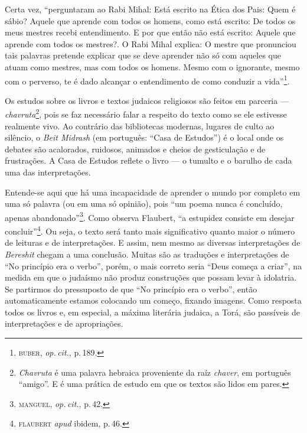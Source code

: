 \begin{center}\end{center}

\noindent{}Certa vez, ``perguntaram ao Rabi Mihal: Está escrito na Ética dos
Pais: Quem é sábio? Aquele que aprende com todos os homens, como está
escrito: De todos os meus mestres recebi entendimento. E por que então
não está escrito: Aquele que aprende com todos os mestres?. O Rabi
Mihal explica: O mestre que pronunciou tais palavras pretende explicar
que se deve aprender não só com aqueles que atuam como mestres, mas com
todos os homens. Mesmo com o ignorante, mesmo com o perverso, te é dado
alcançar o entendimento de como conduzir a vida''\footnote{\textsc{buber},
  \emph{op.\,cit.}, p.\,189.}.

Os estudos sobre os livros e textos judaicos religiosos são feitos em
parceria --- \emph{chavruta}\footnote{\emph{Chavruta} é uma palavra
  hebraica proveniente da raíz \emph{chaver}, em português
  ``amigo''. E é uma prática de estudo em que os textos são lidos em
  pares.}, pois se faz necessário falar a respeito do texto como se ele
estivesse realmente vivo. Ao contrário das bibliotecas modernas, lugares
de culto ao silêncio, o \emph{Beit Midrash} (em português: ``Casa de
Estudos'') é o local onde os debates são acalorados, ruidosos, animados
e cheios de gesticulação e de frustrações. A Casa de Estudos reflete o
livro --- o tumulto e o barulho de cada uma das interpretações.

Entende-se aqui que há uma incapacidade de aprender o mundo por completo
em uma só palavra (ou em uma só opinião), pois ``um poema nunca é
concluído, apenas abandonado''\footnote{\textsc{manguel}, \emph{op.\,cit.}, p.\,42.}.
Como observa Flaubert, ``a estupidez consiste em desejar
concluir''\footnote{\textsc{flaubert} \emph{apud} ibidem, p.\,46.}. Ou seja, o texto
será tanto mais significativo quanto maior o número de leituras e de
interpretações. E assim, nem mesmo as diversas interpretações de
\emph{Bereshit} chegam a uma conclusão. Muitas são as traduções e
interpretações de ``No princípio era o verbo'', porém, o mais
correto seria ``Deus começa a criar'', na medida em que o
judaísmo não produz construções que possam levar à idolatria. Se partirmos do
pressuposto de que ``No princípio era o verbo'', então
automaticamente estamos colocando um começo, fixando imagens. Como
resposta todos os livros e, em especial, a máxima literária judaica, a
Torá, são passíveis de interpretações e de apropriações.


